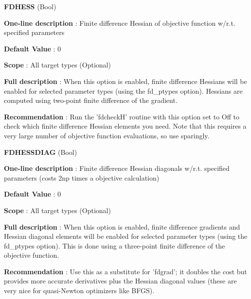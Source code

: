 \begin{DoxyItemize}
\item {\bfseries  F\-D\-H\-E\-S\-S } (Bool) \par
{\bfseries  One-\/line description }\-: Finite difference Hessian of objective function w/r.\-t. specified parameters \par
{\bfseries  Default Value }\-: 0 \par
{\bfseries  Scope }\-: All target types (Optional) \par
{\bfseries  Full description }\-: When this option is enabled, finite difference Hessians will be enabled for selected parameter types (using the fd\-\_\-ptypes option). Hessians are computed using two-\/point finite difference of the gradient. \par
{\bfseries  Recommendation }\-: Run the 'fdcheck\-H' routine with this option set to Off to check which finite difference Hessian elements you need. Note that this requires a very large number of objective function evaluations, so use sparingly.\end{DoxyItemize}
\begin{DoxyItemize}
\item {\bfseries  F\-D\-H\-E\-S\-S\-D\-I\-A\-G } (Bool) \par
{\bfseries  One-\/line description }\-: Finite difference Hessian diagonals w/r.\-t. specified parameters (costs 2np times a objective calculation) \par
{\bfseries  Default Value }\-: 0 \par
{\bfseries  Scope }\-: All target types (Optional) \par
{\bfseries  Full description }\-: When this option is enabled, finite difference gradients and Hessian diagonal elements will be enabled for selected parameter types (using the fd\-\_\-ptypes option). This is done using a three-\/point finite difference of the objective function. \par
{\bfseries  Recommendation }\-: Use this as a substitute for 'fdgrad'; it doubles the cost but provides more accurate derivatives plus the Hessian diagonal values (these are very nice for quasi-\/\-Newton optimizers like B\-F\-G\-S).\end{DoxyItemize}
